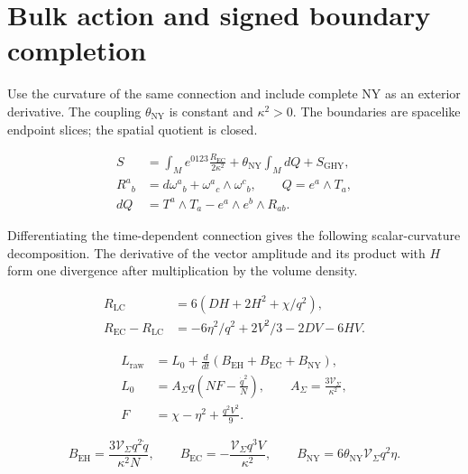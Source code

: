 \section{Bulk action and signed boundary completion}

Use the curvature of the same connection and include complete NY as an exterior derivative. The coupling $\theta_{\mathrm{NY}}$ is constant and $\kappa^2>0$. The boundaries are spacelike endpoint slices; the spatial quotient is closed.

\begin{equation}\tag{B-01}\label{eq:B-01}
\begin{aligned}
S&=\int_M e^{0123}\frac{R_{\mathrm{EC}}}{2\kappa^2}
+\theta_{\mathrm{NY}}\int_M dQ+S_{\mathrm{GHY}},\\
R^a{}_{b}&=d\omega^a{}_{b}+\omega^a{}_{c}\wedge\omega^c{}_{b},\qquad Q=e^a\wedge T_a,\\
dQ&=T^a\wedge T_a-e^a\wedge e^b\wedge R_{ab}.
\end{aligned}
\end{equation}

Differentiating the time-dependent connection gives the following scalar-curvature decomposition. The derivative of the vector amplitude and its product with $H$ form one divergence after multiplication by the volume density.

\begin{equation}\tag{B-02}\label{eq:B-02}
\begin{aligned}
R_{\mathrm{LC}}&=6(DH+2H^2+\chi/q^2),\\
R_{\mathrm{EC}}-R_{\mathrm{LC}}&=-6\eta^2/q^2+2V^2/3-2DV-6HV.
\end{aligned}
\end{equation}

\begin{equation}\tag{B-03}\label{eq:B-03}
\begin{aligned}
L_{\mathrm{raw}}&=L_0+\frac d{dt}(B_{\mathrm{EH}}+B_{\mathrm{EC}}+B_{\mathrm{NY}}),\\
L_0&=A_{\Sigma}q\left(NF-\frac{\dot q^2}{N}\right),\qquad
A_{\Sigma}=\frac{3\mathcal V_{\Sigma}}{\kappa^2},\\
F&=\chi-\eta^2+\frac{q^2V^2}{9}.
\end{aligned}
\end{equation}

\begin{equation}\tag{B-04}\label{eq:B-04}
B_{\mathrm{EH}}=\frac{3\mathcal V_{\Sigma}q^2\dot q}{\kappa^2N},\qquad
B_{\mathrm{EC}}=-\frac{\mathcal V_{\Sigma}q^3V}{\kappa^2},\qquad
B_{\mathrm{NY}}=6\theta_{\mathrm{NY}}\mathcal V_{\Sigma}q^2\eta.
\end{equation}

